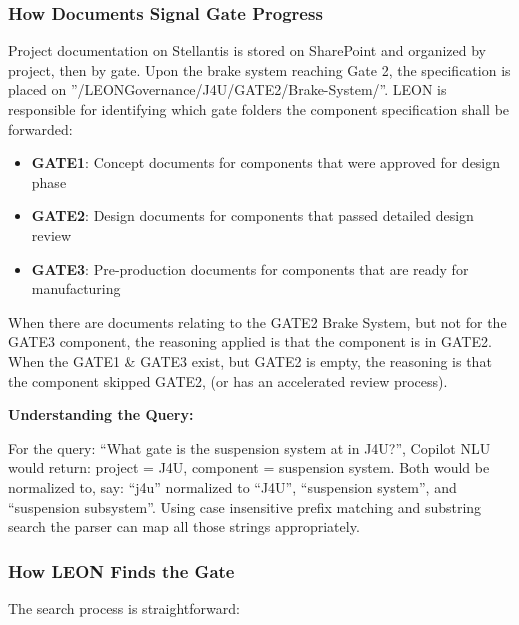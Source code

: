 \subsubsection{\textcolor[HTML]{0066CC}{How Documents Signal Gate Progress}}

Project documentation on Stellantis is stored on SharePoint and organized by project, then by gate. Upon the brake system reaching Gate 2, the specification is placed on ”/LEONGovernance/J4U/GATE2/Brake-System/”. LEON is responsible for identifying which gate folders the component specification shall be forwarded:
\begin{itemize}
    \item[\quad\textbullet] \textbf{GATE1}: Concept documents for components that were approved for design phase
    \item[\quad\textbullet] \textbf{GATE2}: Design documents for components that passed detailed design review
    \item[\quad\textbullet] \textbf{GATE3}: Pre-production documents for components that are ready for manufacturing
\end{itemize}

When there are documents relating to the GATE2 Brake System, but not for the GATE3 component, the reasoning applied is that the component is in GATE2. When the GATE1 \& GATE3 exist, but GATE2 is empty, the reasoning is that the component skipped GATE2, (or has an accelerated review process).
\vspace{0.2cm}

\noindent\textbf{Understanding the Query:}

For the query: “What gate is the suspension system at in J4U?”, Copilot NLU would return: project = J4U, component = suspension system. Both would be normalized to, say: “j4u” normalized to “J4U”, “suspension system”, and “suspension subsystem”. Using case insensitive prefix matching and substring search the parser can map all those strings appropriately.
\subsubsection{\textcolor[HTML]{0066CC}{How LEON Finds the Gate}}

The search process is straightforward:

